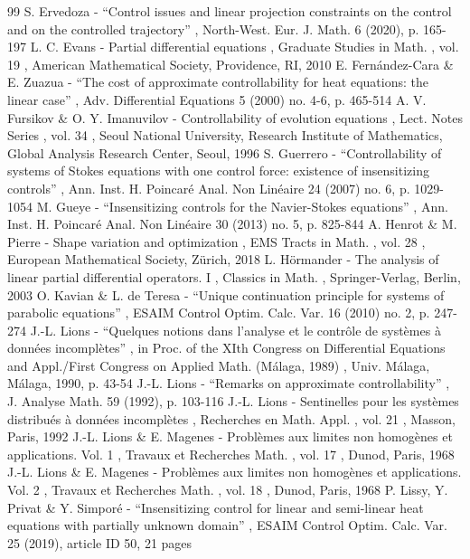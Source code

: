 \documentclass[11pt]{article}
\numberwithin{equation}{section}
\theoremstyle{definition}
\begin{document}
\begin{thebibliography}{99}
 S. Ervedoza - “Control issues and linear projection constraints on the control and on the controlled trajectory” , North-West. Eur. J. Math. 6 (2020), p. 165-197
 L. C. Evans - Partial differential equations , Graduate Studies in Math. , vol. 19 , American Mathematical Society, Providence, RI, 2010
 E. Fernández-Cara \& E. Zuazua - “The cost of approximate controllability for heat equations: the linear case” , Adv. Differential Equations 5 (2000) no. 4-6, p. 465-514
 A. V. Fursikov \& O. Y. Imanuvilov - Controllability of evolution equations , Lect. Notes Series , vol. 34 , Seoul National University, Research Institute of Mathematics, Global Analysis Research Center, Seoul, 1996
 S. Guerrero - “Controllability of systems of Stokes equations with one control force: existence of insensitizing controls” , Ann. Inst. H. Poincaré Anal. Non Linéaire 24 (2007) no. 6, p. 1029-1054
 M. Gueye - “Insensitizing controls for the Navier-Stokes equations” , Ann. Inst. H. Poincaré Anal. Non Linéaire 30 (2013) no. 5, p. 825-844
 A. Henrot \& M. Pierre - Shape variation and optimization , EMS Tracts in Math. , vol. 28 , European Mathematical Society, Zürich, 2018
 L. Hörmander - The analysis of linear partial differential operators. I , Classics in Math. , Springer-Verlag, Berlin, 2003
 O. Kavian \& L. de Teresa - “Unique continuation principle for systems of parabolic equations” , ESAIM Control Optim. Calc. Var. 16 (2010) no. 2, p. 247-274
 J.-L. Lions - “Quelques notions dans l’analyse et le contrôle de systèmes à données incomplètes” , in Proc. of the XIth Congress on Differential Equations and Appl./First Congress on Applied Math. (Málaga, 1989) , Univ. Málaga, Málaga, 1990, p. 43-54
 J.-L. Lions - “Remarks on approximate controllability” , J. Analyse Math. 59 (1992), p. 103-116
 J.-L. Lions - Sentinelles pour les systèmes distribués à données incomplètes , Recherches en Math. Appl. , vol. 21 , Masson, Paris, 1992
 J.-L. Lions \& E. Magenes - Problèmes aux limites non homogènes et applications. Vol. 1 , Travaux et Recherches Math. , vol. 17 , Dunod, Paris, 1968
 J.-L. Lions \& E. Magenes - Problèmes aux limites non homogènes et applications. Vol. 2 , Travaux et Recherches Math. , vol. 18 , Dunod, Paris, 1968
 P. Lissy, Y. Privat \& Y. Simporé - “Insensitizing control for linear and semi-linear heat equations with partially unknown domain” , ESAIM Control Optim. Calc. Var. 25 (2019), article ID 50, 21 pages

\end{thebibliography}
\end{document}
